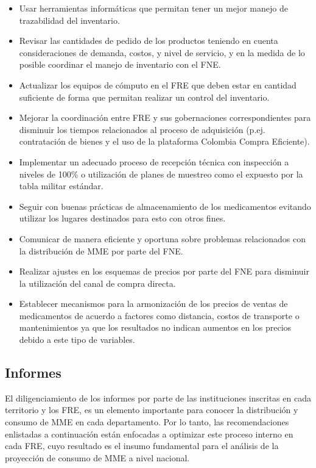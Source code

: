\documentclass[
  oneside]{book}
\begin{document}
\begin{itemize}
\item
  Usar herramientas informáticas que permitan tener un mejor manejo de trazabilidad del inventario.
\item
  Revisar las cantidades de pedido de los productos teniendo en cuenta consideraciones de demanda, costos, y nivel de servicio, y en la medida de lo posible coordinar el manejo de inventario con el FNE.
\item
  Actualizar los equipos de cómputo en el FRE que deben estar en cantidad suficiente de forma que permitan realizar un control del inventario.
\item
  Mejorar la coordinación entre FRE y sus gobernaciones correspondientes para disminuir los tiempos relacionados al proceso de adquisición (p.ej. contratación de bienes y el uso de la plataforma Colombia Compra Eficiente).
\item
  Implementar un adecuado proceso de recepción técnica con inspección a niveles de 100\% o utilización de planes de muestreo como el expuesto por la tabla militar estándar.
\item
  Seguir con buenas prácticas de almacenamiento de los medicamentos evitando utilizar los lugares destinados para esto con otros fines.
\item
  Comunicar de manera eficiente y oportuna sobre problemas relacionados con la distribución de MME por parte del FNE.
\item
  Realizar ajustes en los esquemas de precios por parte del FNE para disminuir la utilización del canal de compra directa.
\item
  Establecer mecanismos para la armonización de los precios de ventas de medicamentos de acuerdo a factores como distancia, costos de transporte o mantenimientos ya que los resultados no indican aumentos en los precios debido a este tipo de variables.
\end{itemize}

\hypertarget{informes}{%
\subsection{Informes}\label{informes}}

El diligenciamiento de los informes por parte de las instituciones inscritas en cada territorio y los FRE, es un elemento importante para conocer la distribución y consumo de MME en cada departamento. Por lo tanto, las recomendaciones enlistadas a continuación están enfocadas a optimizar este proceso interno en cada FRE, cuyo resultado es el insumo fundamental para el análisis de la proyección de consumo de MME a nivel nacional.
\end{document}
